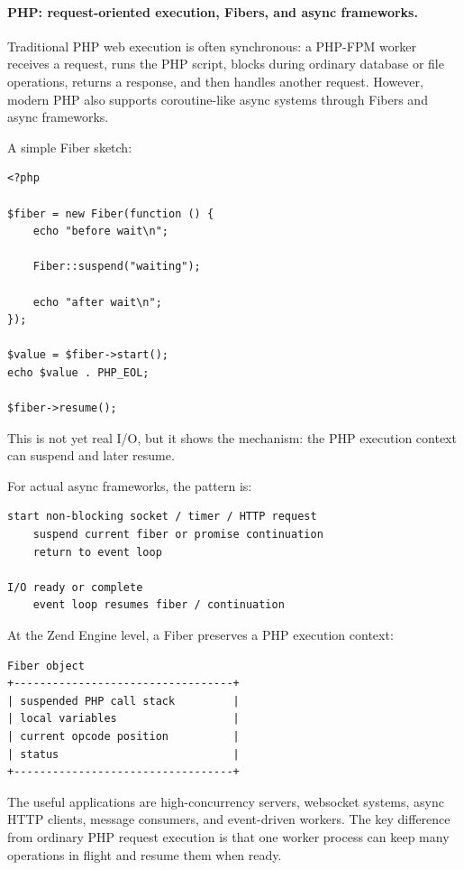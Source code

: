 \paragraph{PHP: request-oriented execution, Fibers, and async frameworks.}

Traditional PHP web execution is often synchronous: a PHP-FPM worker receives a request, runs the PHP script, blocks during ordinary database or file operations, returns a response, and then handles another request. However, modern PHP also supports coroutine-like async systems through Fibers and async frameworks.

A simple Fiber sketch:

\begin{verbatim}
<?php

$fiber = new Fiber(function () {
    echo "before wait\n";

    Fiber::suspend("waiting");

    echo "after wait\n";
});

$value = $fiber->start();
echo $value . PHP_EOL;

$fiber->resume();
\end{verbatim}

This is not yet real I/O, but it shows the mechanism: the PHP execution context can suspend and later resume.

For actual async frameworks, the pattern is:

\begin{verbatim}
start non-blocking socket / timer / HTTP request
    suspend current fiber or promise continuation
    return to event loop

I/O ready or complete
    event loop resumes fiber / continuation
\end{verbatim}

At the Zend Engine level, a Fiber preserves a PHP execution context:

\begin{verbatim}
Fiber object
+----------------------------------+
| suspended PHP call stack         |
| local variables                  |
| current opcode position          |
| status                           |
+----------------------------------+
\end{verbatim}

The useful applications are high-concurrency servers, websocket systems, async HTTP clients, message consumers, and event-driven workers. The key difference from ordinary PHP request execution is that one worker process can keep many operations in flight and resume them when ready.

